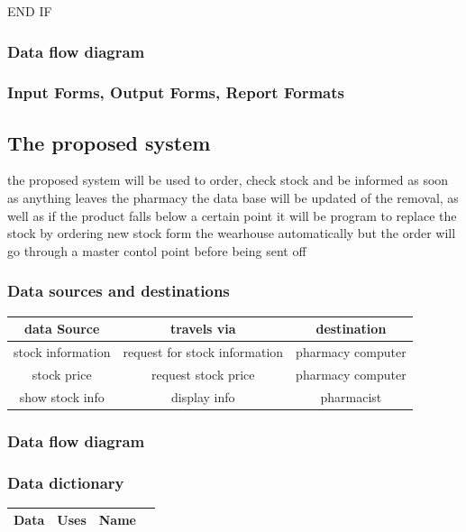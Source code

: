 END IF

\subsubsection{Data flow diagram}




\subsubsection{Input Forms, Output Forms, Report Formats}

\subsection{The proposed system}
the proposed system will be used to order, check stock and be informed as soon as anything leaves the pharmacy the data base will be updated of the removal, as well as if the product falls below a certain point it will be program to replace the stock by ordering new stock form the wearhouse automatically but the order will go through a master contol point before being sent off 
\subsubsection{Data sources and destinations}
\begin{table}[h]
\begin{tabular}{|c|c|c|}
\hline\hline
data Source & travels via & destination\\
\hline
stock information & request for stock information & pharmacy computer\\
\hline
stock price & request stock price & pharmacy computer\\
\hline
show stock info & display info & pharmacist\\ 
\hline
\end{tabular}
\label{table:nonlin}

\end{table}
\subsubsection{Data flow diagram}

\subsubsection{Data dictionary}
\begin{table}[h]
\begin{tabular}{|c|c|c|c|}
\hline
Data & Uses & Name \\
\hline

\end{tabular}
\label{table:nonlin}
\end{table}

